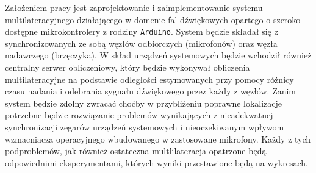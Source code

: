 Założeniem pracy jest zaprojektowanie i zaimplementowanie systemu multilateracyjnego działającego w domenie fal dźwiękowych opartego o szeroko dostępne mikrokontrolery z rodziny \texttt{Arduino}. System będzie składał się z synchronizowanych ze sobą węzłów odbiorczych (mikrofonów) oraz węzła nadawczego (brzęczyka). W skład urządzeń systemowych będzie wchodził również centralny serwer obliczeniowy, który będzie wykonywał obliczenia multilateracyjne na podstawie odległości estymowanych przy pomocy różnicy czasu nadania i odebrania sygnału dźwiękowego przez każdy z węzłów. Zanim system będzie zdolny zwracać choćby w przybliżeniu poprawne lokalizacje potrzebne będzie rozwiązanie problemów wynikających z nieadekwatnej synchronizacji zegarów urządzeń systemowych i nieoczekiwanym wpływom wzmacniacza operacyjnego wbudowanego w zastosowane mikrofony. Każdy z tych podproblemów, jak również ostateczna multlilateracja opatrzone będą odpowiednimi eksperymentami, których wyniki przestawione będą na wykresach.